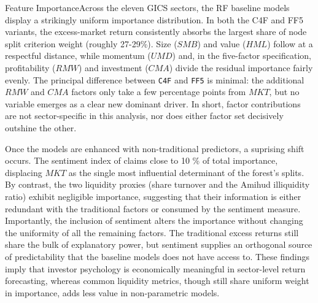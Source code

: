 {Feature Importance}Across the eleven GICS sectors, the RF baseline models display a strikingly uniform importance distribution. In both the C4F and FF5 variants, the excess-market return consistently absorbs the largest share of node split criterion weight (roughly 27-29\%). Size ($SMB$) and value ($HML$) follow at a respectful distance, while momentum ($UMD$) and, in the five-factor specification, profitability ($RMW$) and investment ($CMA$) divide the residual importance fairly evenly. The principal difference between \texttt{C4F} and \texttt{FF5} is minimal: the additional $RMW$ and $CMA$ factors only take a few percentage points from $MKT$, but no variable emerges as a clear new dominant driver. In short, factor contributions are not sector-specific in this analysis, nor does either factor set decisively outshine the other.

Once the models are enhanced with non-traditional predictors, a suprising shift occurs. The sentiment index of  claims close to 10 \% of total importance, displacing $MKT$ as the single most influential determinant of the forest's splits. By contrast, the two liquidity proxies (share turnover and the Amihud illiquidity ratio) exhibit negligible importance, suggesting that their information is either redundant with the traditional factors or consumed by the sentiment measure. Importantly, the inclusion of sentiment alters the importance without changing the uniformity of all the remaining factors. The traditional excess returns still share the bulk of explanatory power, but sentiment supplies an orthogonal source of predictability that the baseline models does not have access to. These findings imply that investor psychology is economically meaningful in sector-level return forecasting, whereas common liquidity metrics, though still share uniform weight in importance, adds less value in non-parametric models.

 







